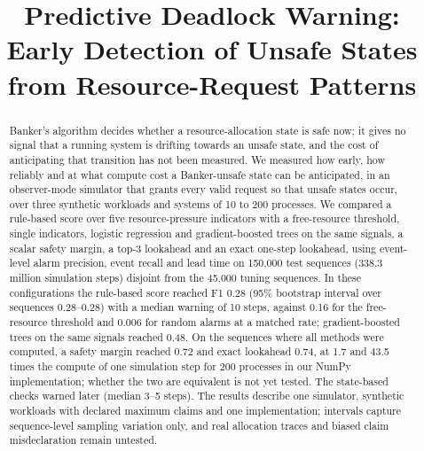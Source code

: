 \documentclass[conference]{IEEEtran}
\begin{document}
\title{Predictive Deadlock Warning: Early Detection of Unsafe States from Resource-Request Patterns}

\author{
\and
{}
}

\maketitle

\begin{abstract}
Banker's algorithm decides whether a resource-allocation state is safe now; it gives no signal that a running system is drifting towards an unsafe state, and the cost of anticipating that transition has not been measured. We measured how early, how reliably and at what compute cost a Banker-unsafe state can be anticipated, in an observer-mode simulator that grants every valid request so that unsafe states occur, over three synthetic workloads and systems of 10 to 200 processes. We compared a rule-based score over five resource-pressure indicators with a free-resource threshold, single indicators, logistic regression and gradient-boosted trees on the same signals, a scalar safety margin, a top-3 lookahead and an exact one-step lookahead, using event-level alarm precision, event recall and lead time on 150,000 test sequences (338.3 million simulation steps) disjoint from the 45,000 tuning sequences. In these configurations the rule-based score reached F1 0.28 (95\% bootstrap interval over sequences 0.28--0.28) with a median warning of 10 steps, against 0.16 for the free-resource threshold and 0.006 for random alarms at a matched rate; gradient-boosted trees on the same signals reached 0.48. On the sequences where all methods were computed, a safety margin reached 0.72 and exact lookahead 0.74, at 1.7 and 43.5 times the compute of one simulation step for 200 processes in our NumPy implementation; whether the two are equivalent is not yet tested. The state-based checks warned later (median 3--5 steps). The results describe one simulator, synthetic workloads with declared maximum claims and one implementation; intervals capture sequence-level sampling variation only, and real allocation traces and biased claim misdeclaration remain untested.
\end{abstract}
\end{document}

